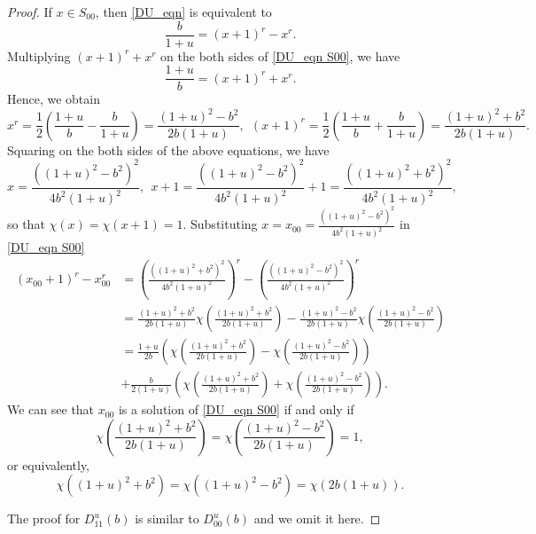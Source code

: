\documentclass[11pt]{article}
\numberwithin{theorem}{section}
\begin{document}
\begin{proof}
	If $x\in S_{00}$, then \eqref{DU_eqn} is equivalent to 
	\begin{equation}\label{DU_eqn S00}
		\frac{b}{1+u} = (x+1)^r- x^r.  
	\end{equation}
	Multiplying $(x+1)^r+ x^r$ on the both sides of \eqref{DU_eqn S00}, we have 
	\begin{equation*}
		\frac{1+u}{b}=(x+1)^r+ x^r.
	\end{equation*}
	Hence, we obtain
	\begin{equation*}
		x^r = \frac{1}{2}\left( \frac{1+u}{b} - \frac{b}{1+u} \right) = \frac{(1+u)^2-b^2}{2b(1+u)}, \ \ (x+1)^r = \frac{1}{2}\left( \frac{1+u}{b} + \frac{b}{1+u} \right) = \frac{(1+u)^2 + b^2}{2b(1+u)}.
	\end{equation*}
	Squaring on the both sides of the above equations, we have
	\begin{equation*}
		x = \frac{((1+u)^2-b^2)^2}{4b^2(1+u)^2}, \ \ x+1 = \frac{((1+u)^2-b^2)^2}{4b^2(1+u)^2} + 1 =  \frac{((1+u)^2 + b^2)^2}{4b^2(1+u)^2} , 
	\end{equation*}
	so that $\chi(x)=\chi(x+1)=1$. Substituting $x=x_{00} = \frac{((1+u)^2-b^2)^2}{4b^2(1+u)^2}$ in \eqref{DU_eqn S00} 
	\begin{align*}
		 (x_{00}+1)^r - x_{00}^r &= \left( \frac{ \left( 	(1+u)^2+b^2\right)^2}{4b^2(1+u)^2}\right)^r - \left( \frac{\left( (1+u)^2-b^2\right)^2}{4b^2(1+u)^2}\right)^r  \\
		&= \frac{(1+u)^2+b^2}{2b(1+u)}\chi\left( \frac{(1+u)^2+b^2}{2b(1+u)} \right) - \frac{(1+u)^2-b^2}{2b(1+u)}\chi\left( \frac{(1+u)^2-b^2}{2b(1+u)} \right)   \\
		&=\frac{1+u}{2b}\left( \chi\left( \frac{(1+u)^2+b^2}{2b(1+u)}\right)  -\chi\left( \frac{(1+u)^2-b^2}{2b(1+u)}\right) \right) \\
		&+\frac{b}{2(1+u)}\left( \chi\left( \frac{(1+u)^2+b^2}{2b(1+u)}\right)  +\chi\left( \frac{(1+u)^2-b^2}{2b(1+u)}\right) \right).
	\end{align*}
	We can see that $x_{00}$ is a solution of \eqref{DU_eqn S00} if and only if 
	\begin{equation}\label{DU_eqn S00 sol}
		\chi\left( \frac{(1+u)^2+b^2}{2b(1+u)}\right)=\chi\left( \frac{(1+u)^2-b^2} {2b(1+u)}\right)=1,
	\end{equation}
	or equivalently,
	\begin{equation*}
		\chi((1+u)^2+b^2)=\chi((1+u)^2-b^2)=\chi(2b(1+u)).
	\end{equation*}

	The proof for $D_{11}^u(b)$ is similar to $D_{00}^u(b)$ and we omit it here.
\end{proof}
\end{document}
